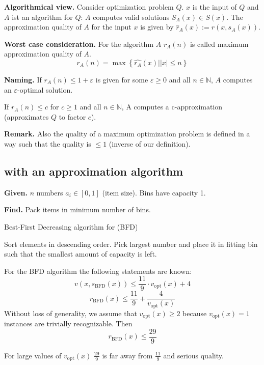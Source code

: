 \documentclass[a4paper]{article}
\newcommand{\given}[1]{\textbf{Given.} #1\par}
\newcommand{\find}[1]{\textbf{Find.} #1\par}
\newcommand{\probl}[1]{\text{\textsc{#1}}}
\newenvironment{spec}[0]{\begin{framed}}{\end{framed}}
\begin{document}
\textbf{Algorithmical view.}
Consider optimization problem $Q$. $x$ is the input of $Q$
and $A$ ist an algorithm for $Q$: $A$ computes valid solutions
$S_A(x) \in S(x)$. The approximation quality of $A$ for the input
$x$ is given by $\hat{r}_A(x) := r(x, s_A(x))$.

\textbf{Worst case consideration.}
For the algorithm $A$ $r_A(n)$ is called maximum approximation quality
of $A$.
\[
  r_A(n) = \max\left\{\hat{r_A}(x) \left| |x| \leq n\right\}\right.
\]

\textbf{Naming.}
If $r_A(n) \leq 1 + \varepsilon$ is given for some $\varepsilon \geq 0$
and all $n \in \mathbb{N}$, $A$ computes an $\varepsilon$-optimal solution.

If $r_A(n) \leq c$ for $c \geq 1$ and all $n \in \mathbb{N}$,
A computes a c-approximation (approximates $Q$ to factor $c$).

\textbf{Remark.}
Also the quality of a maximum optimization problem is defined in a way
such that the quality is $\leq 1$ (inverse of our definition).

\subsection{\probl{Bin-Pack} with an approximation algorithm}
\label{sec:approx-bin-pack}
%
\begin{spec}
  \given{$n$ numbers $a_i \in [0,1]$ (item size). Bins have capacity 1.}
  \find{Pack items in minimum number of bins.}
\end{spec}

\begin{algorithm}
\caption{Best-First Decreasing algorithm for \probl{Bin-Pack} (BFD)}
\begin{algorithmic}[1]
  \State Sort elements in descending order.
  \State Pick largest number and place it in fitting bin such that the smallest amount of capacity is left.
\end{algorithmic}
\end{algorithm}

For the BFD algorithm the following statements are known:
\[
  v(x, s_{\text{BFD}}(x)) \leq \frac{11}9 \cdot v_\text{opt}(x) + 4
\] \[
  r_{\text{BFD}}(x) \leq \frac{11}{9} + \frac4{v_{\text{opt}}(x)}
\]
Without loss of generality, we assume that $v_{\text{opt}}(x) \geq 2$
because $v_{\text{opt}}(x) = 1$ instances are trivially recognizable.
Then
\[
  r_{\text{BFD}}(x) \leq \frac{29}{9}
\]

For large values of $v_{\text{opt}}(x)$ $\frac{29}{9}$ is far away from $\frac{11}{9}$ and serious quality.
\end{document}
